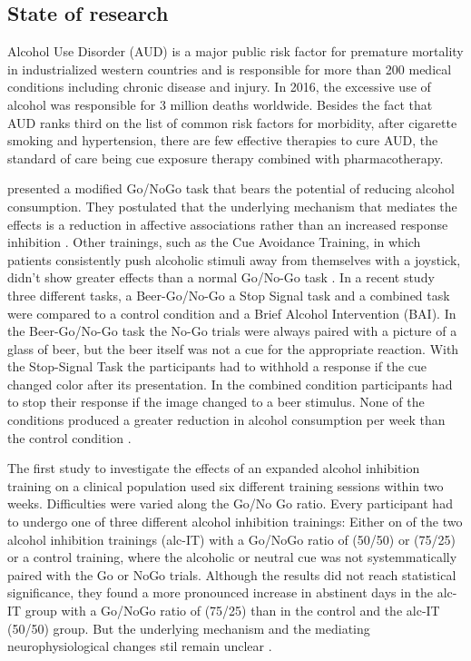 \documentclass[12pt]{article}
\begin{document}
\subsection{State of research}
Alcohol Use Disorder (AUD) is a major public risk factor for premature mortality in industrialized western countries and is responsible for more than 200 medical conditions including chronic disease and injury. In 2016, the excessive use of alcohol was responsible for 3 million deaths worldwide. Besides the fact that AUD ranks third on the list of common risk factors for morbidity, after cigarette smoking and hypertension, there are few effective therapies to cure AUD, the standard of care being cue exposure therapy combined with pharmacotherapy. 

\textcite{houbenBeerNogoLearning2012} presented a modified Go/NoGo task that bears the potential of reducing alcohol consumption. They postulated that the underlying mechanism that mediates the effects is a reduction in affective associations rather than an increased response inhibition \parencite{houbenBeerNogoLearning2012}. Other trainings, such as the Cue Avoidance Training, in which patients consistently push alcoholic stimuli away from themselves with a joystick, didn’t show greater effects than a normal Go/No-Go task \parencite{dilemmaCueAvoidanceTraining2017}. In a recent study three different tasks, a Beer-Go/No-Go a Stop Signal task and a combined task were compared to a control condition and a Brief Alcohol Intervention (BAI). In the Beer-Go/No-Go task the No-Go trials were always paired with a picture of a glass of beer, but the beer itself was not a cue for the appropriate reaction. With the Stop-Signal Task the participants had to withhold a response if the cue changed color after its presentation. In the combined condition participants had to stop their response if the image changed to a beer stimulus. None of the conditions produced a greater reduction in alcohol consumption per week than the control condition \parencite{smithCurrentFormsInhibitory2017}. 

The first study to investigate the effects of an expanded alcohol inhibition training on a clinical population used six different training sessions within two weeks. Difficulties were varied along the Go/No Go ratio. Every participant had to undergo one of three different alcohol inhibition trainings: Either on of the two alcohol inhibition trainings (alc-IT) with a Go/NoGo ratio of (50/50) or (75/25) or a control training, where the alcoholic or neutral cue was not systemmatically paired with the Go or NoGo trials. Although the results did not reach statistical significance, they found a more pronounced increase in abstinent days in the alc-IT group with a Go/NoGo ratio of (75/25) than in the control and the alc-IT (50/50) group. But the underlying mechanism and the mediating neurophysiological changes stil remain unclear \parencite{tschuemperlinLearningResistUrge2019}.
\end{document}
